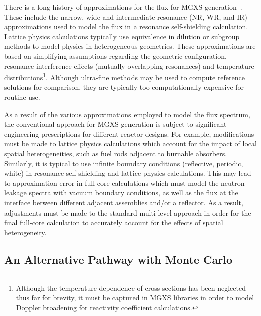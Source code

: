 
There is a long history of approximations for the flux for \ac{MGXS} generation~\cite{cacuci2010handbook}. These include the narrow, wide and intermediate resonance (NR, WR, and IR) approximations used to model the flux in a resonance self-shielding calculation. Lattice physics calculations typically use equivalence in dilution or subgroup methods to model physics in heterogeneous geometries. These approximations are based on simplifying assumptions regarding the geometric configuration, resonance interference effects (mutually overlapping resonances) and temperature distributions\footnote{Although the temperature dependence of cross sections has been neglected thus far for brevity, it must be captured in \ac{MGXS} libraries in order to model Doppler broadening for reactivity coefficient calculations.}. Although ultra-fine methods may be used to compute reference solutions for comparison, they are typically too computationally expensive for routine use. 

As a result of the various approximations employed to model the flux spectrum, the conventional approach for \ac{MGXS} generation is subject to significant engineering prescriptions for different reactor designs.  For example, modifications must be made to lattice physics calculations which account for the impact of local spatial heterogeneities, such as fuel rods adjacent to burnable absorbers. Similarly, it is typical to use infinite boundary conditions (reflective, periodic, white) in resonance self-shielding and lattice physics calculations. This may lead to approximation error in full-core calculations which must model the neutron leakage spectra with vacuum boundary conditions, as well as the flux at the interface between different adjacent assemblies and/or a reflector. As a result, adjustments must be made to the standard multi-level approach in order for the final full-core calculation to accurately account for the effects of spatial heterogeneity.


\subsection{An Alternative Pathway with Monte Carlo}
\label{subsec:chap2-mgxs-lib-mc}

